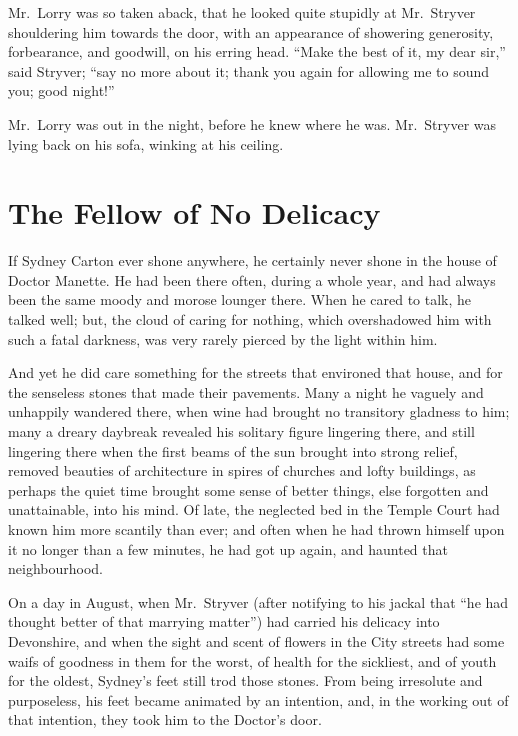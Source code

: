 Mr.\ Lorry was so taken aback, that he looked quite stupidly at
Mr.\ Stryver shouldering him towards the door, with an appearance of
showering generosity, forbearance, and goodwill, on his erring head.
``Make the best of it, my dear sir,'' said Stryver; ``say no more
about it; thank you again for allowing me to sound you; good night!''

Mr.\ Lorry was out in the night, before he knew where he was.
Mr.\ Stryver was lying back on his sofa, winking at his ceiling.



\chapter{The Fellow of No Delicacy}


If Sydney Carton ever shone anywhere, he certainly never shone in the
house of Doctor Manette.  He had been there often, during a whole year,
and had always been the same moody and morose lounger there.  When he
cared to talk, he talked well; but, the cloud of caring for nothing,
which overshadowed him with such a fatal darkness, was very rarely
pierced by the light within him.

And yet he did care something for the streets that environed that house,
and for the senseless stones that made their pavements.  Many a night
he vaguely and unhappily wandered there, when wine had brought
no transitory gladness to him; many a dreary daybreak revealed his
solitary figure lingering there, and still lingering there when the first
beams of the sun brought into strong relief, removed beauties of
architecture in spires of churches and lofty buildings, as perhaps
the quiet time brought some sense of better things, else forgotten
and unattainable, into his mind.  Of late, the neglected bed in the
Temple Court had known him more scantily than ever; and often when he
had thrown himself upon it no longer than a few minutes, he had got up
again, and haunted that neighbourhood.

On a day in August, when Mr.\ Stryver (after notifying to his jackal
that ``he had thought better of that marrying matter'') had carried his
delicacy into Devonshire, and when the sight and scent of flowers in
the City streets had some waifs of goodness in them for the worst,
of health for the sickliest, and of youth for the oldest, Sydney's feet
still trod those stones.  From being irresolute and purposeless,
his feet became animated by an intention, and, in the working out of
that intention, they took him to the Doctor's door.

